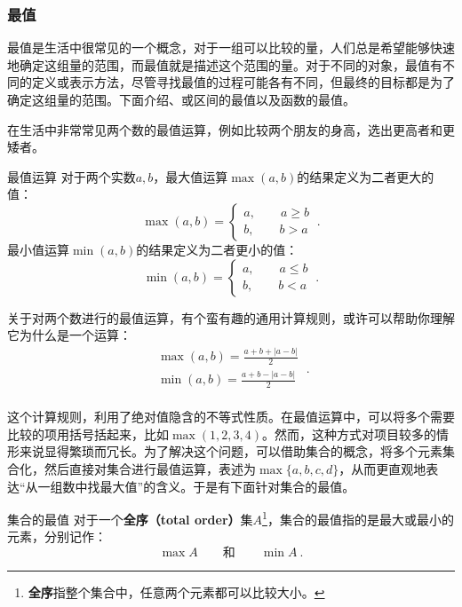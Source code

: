 \subsubsection{最值}

最值是生活中很常见的一个概念，对于一组可以比较的量，人们总是希望能够快速地确定这组量的范围，而最值就是描述这个范围的量。对于不同的对象，最值有不同的定义或表示方法，尽管寻找最值的过程可能各有不同，但最终的目标都是为了确定这组量的范围。下面介绍、或区间的最值以及函数的最值。

在生活中非常常见两个数的最值运算，例如比较两个朋友的身高，选出更高者和更矮者。

\begin{definition}{最值运算}
对于两个实数$a,b$，最大值运算$\max(a,b)$的结果定义为二者更大的值：
\begin{equation}
\max(a,b)=\begin{cases}
a,\qquad a\geq b\\
b,\qquad b>a
\end{cases}~.
\end{equation}
最小值运算$\min(a,b)$的结果定义为二者更小的值：
\begin{equation}
\min(a,b)=\begin{cases}
a,\qquad a\leq b\\
b,\qquad b<a
\end{cases}~.
\end{equation}
\end{definition}

关于对两个数进行的最值运算，有个蛮有趣的通用计算规则，或许可以帮助你理解它为什么是一个运算：
\begin{equation}
\begin{array}{c} 
\displaystyle\max(a, b) = \frac{a + b + |a - b|}{2} \\  
\displaystyle\min(a, b) = \frac{a + b - |a - b|}{2} \\  
\end{array}~.
\end{equation}

这个计算规则，利用了绝对值隐含的不等式性质。在最值运算中，可以将多个需要比较的项用括号括起来，比如$\max(1,2,3,4)$。然而，这种方式对项目较多的情形来说显得繁琐而冗长。为了解决这个问题，可以借助集合的概念，将多个元素集合化，然后直接对集合进行最值运算，表述为$\max\{a, b, c, d\}$，从而更直观地表达“从一组数中找最大值”的含义。于是有下面针对集合的最值。

\begin{definition}{集合的最值}
对于一个\textbf{全序（total order）}集$A$\footnote{\textbf{全序}指整个集合中，任意两个元素都可以比较大小。}，集合的最值指的是最大或最小的元素，分别记作：
\begin{equation}
\max A\qquad\text{和}\qquad\min A~.
\end{equation}
\end{definition}

